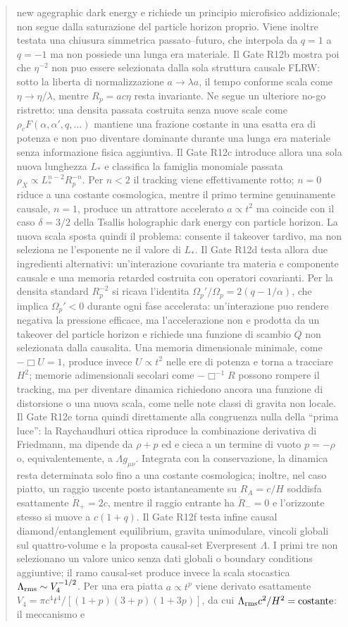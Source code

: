 \documentclass[11pt,a4paper]{article}
\begin{document}
\begin{abstract}
new agegraphic dark energy e richiede un principio microfisico addizionale; non segue dalla saturazione del particle horizon proprio. Viene inoltre testata una chiusura simmetrica passato--futuro, che interpola da $q=1$ a $q=-1$ ma non possiede una lunga era materiale. Il Gate R12b mostra poi che $\eta^{-2}$ non puo essere selezionata dalla sola struttura causale FLRW: sotto la liberta di normalizzazione $a\to\lambda a$, il tempo conforme scala come $\eta\to\eta/\lambda$, mentre $R_p=ac\eta$ resta invariante. Ne segue un ulteriore no-go ristretto: una densita passata costruita senza nuove scale come $\rho_cF(\alpha,\alpha',q,\ldots)$ mantiene una frazione costante in una esatta era di potenza e non puo diventare dominante durante una lunga era materiale senza informazione fisica aggiuntiva. Il Gate R12c introduce allora una sola nuova lunghezza $L_*$ e classifica la famiglia monomiale passata $\rho_X\propto L_*^{n-2}R_p^{-n}$. Per $n<2$ il tracking viene effettivamente rotto; $n=0$ riduce a una costante cosmologica, mentre il primo termine genuinamente causale, $n=1$, produce un attrattore accelerato $a\propto t^2$ ma coincide con il caso $\delta=3/2$ della Tsallis holographic dark energy con particle horizon. La nuova scala sposta quindi il problema: consente il takeover tardivo, ma non seleziona ne l'esponente ne il valore di $L_*$. Il Gate R12d testa allora due ingredienti alternativi: un'interazione covariante tra materia e componente causale e una memoria retarded costruita con operatori covarianti. Per la densita standard $R_p^{-2}$ si ricava l'identita $\Omega_p'/\Omega_p=2(q-1/\alpha)$, che implica $\Omega_p'<0$ durante ogni fase accelerata: un'interazione puo rendere negativa la pressione efficace, ma l'accelerazione non e prodotta da un takeover del particle horizon e richiede una funzione di scambio $Q$ non selezionata dalla causalita. Una memoria dimensionale minimale, come $-\Box U=1$, produce invece $U\propto t^2$ nelle ere di potenza e torna a tracciare $H^2$; memorie adimensionali secolari come $-\Box^{-1}R$ possono rompere il tracking, ma per diventare dinamica richiedono ancora una funzione di distorsione o una nuova scala, come nelle note classi di gravita non locale. Il Gate R12e torna quindi direttamente alla congruenza nulla della ``prima luce'': la Raychaudhuri ottica riproduce la combinazione derivativa di Friedmann, ma dipende da $\rho+p$ ed e cieca a un termine di vuoto $p=-\rho$ o, equivalentemente, a $\Lambda g_{\mu\nu}$. Integrata con la conservazione, la dinamica resta determinata solo fino a una costante cosmologica; inoltre, nel caso piatto, un raggio uscente posto istantaneamente su $R_A=c/H$ soddisfa esattamente $\dot R_+=2c$, mentre il raggio entrante ha $\dot R_-=0$ e l'orizzonte stesso si muove a $c(1+q)$. Il Gate R12f testa infine causal diamond/entanglement equilibrium, gravita unimodulare, vincoli globali sul quattro-volume e la proposta causal-set Everpresent $\Lambda$. I primi tre non selezionano un valore unico senza dati globali o boundary conditions aggiuntive; il ramo causal-set produce invece la scala stocastica $\Lambda_{\rm rms}\sim V_4^{-1/2}$. Per una era piatta $a\propto t^p$ viene derivato esattamente $V_4=\pi c^4t^4/[(1+p)(3+p)(1+3p)]$, da cui $\Lambda_{\rm rms}c^2/H^2=\mathrm{costante}$: il meccanismo e 
\end{abstract}
\end{document}
